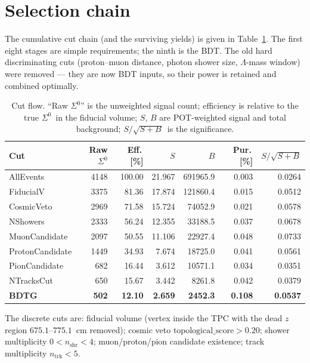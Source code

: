 \documentclass[11pt,a4paper]{article}
\newcommand{\Szero}{\ensuremath{\Sigma^0}}
\newcommand{\Lam}{\ensuremath{\Lambda}}
\newcommand{\FoM}{\ensuremath{S/\sqrt{S+B}}}
\begin{document}
\section{Selection chain}
The cumulative cut chain (and the surviving yields) is given in
Table~\ref{tab:cutflow}. The first eight stages are simple requirements; the
ninth is the BDT. The old hard discriminating cuts (proton--muon distance,
photon shower size, \Lam-mass window) were removed --- they are now BDT inputs,
so their power is retained and combined optimally.

\begin{table}[h]
\centering
\caption{Cut flow. ``Raw \Szero'' is the unweighted signal count; efficiency is
relative to the true \Szero\ in the fiducial volume; $S$, $B$ are POT-weighted
signal and total background; \FoM\ is the significance.}
\label{tab:cutflow}
\begin{tabular}{lrrrrrr}
\toprule
Cut & Raw \Szero & Eff.\,[\%] & $S$ & $B$ & Pur.\,[\%] & \FoM \\
\midrule
AllEvents       & 4148 & 100.00 & 21.967 & 691965.9 & 0.003 & 0.0264 \\
FiducialV       & 3375 & 81.36  & 17.874 & 121860.4 & 0.015 & 0.0512 \\
CosmicVeto      & 2969 & 71.58  & 15.724 & 74052.9  & 0.021 & 0.0578 \\
NShowers        & 2333 & 56.24  & 12.355 & 33188.5  & 0.037 & 0.0678 \\
MuonCandidate   & 2097 & 50.55  & 11.106 & 22927.4  & 0.048 & 0.0733 \\
ProtonCandidate & 1449 & 34.93  & 7.674  & 18725.0  & 0.041 & 0.0561 \\
PionCandidate   & 682  & 16.44  & 3.612  & 10571.1  & 0.034 & 0.0351 \\
NTracksCut      & 650  & 15.67  & 3.442  & 8261.8   & 0.042 & 0.0379 \\
\textbf{BDTG}   & \textbf{502} & \textbf{12.10} & \textbf{2.659} & \textbf{2452.3} & \textbf{0.108} & \textbf{0.0537} \\
\bottomrule
\end{tabular}
\end{table}

\noindent The discrete cuts are: fiducial volume (vertex inside the TPC with the
dead $z$ region $675.1$--$775.1$~cm removed); cosmic veto
$\mathrm{topological\_score}>0.20$; shower multiplicity $0<n_\mathrm{shr}<4$;
muon/proton/pion candidate existence; track multiplicity $n_\mathrm{trk}<5$.
\end{document}
